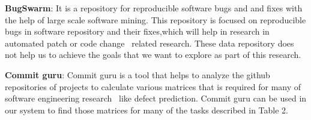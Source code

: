 \textbf{BugSwarm}: It is a repository for reproducible software bugs and and fixes with the help of large scale software mining. This repository is focused on reproducible bugs in software repository and their fixes,which will help in research in automated patch or code change~\cite{sruthi2016survey, tomassi2018bugs} related research. These data repository does not help us to achieve the goals that we want to explore as part of this research.

\textbf{Commit guru}: Commit guru is a tool that helps to analyze the github repositories of projects to calculate various matrices that is required for many of software engineering research~\cite{rosen2015commit, kamei2013large, shihab2012industrial, shihab2011high} like defect prediction. Commit guru can be used in our system to find those matrices for many of the tasks described in Table 2.


% 
%
%


